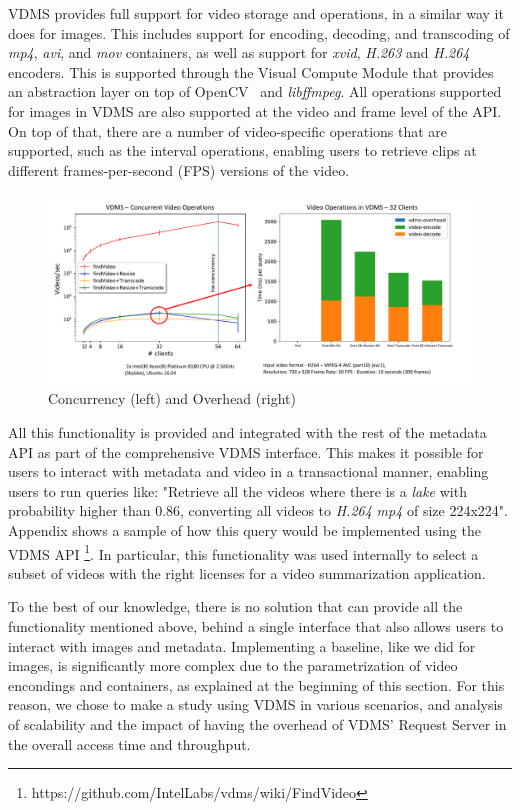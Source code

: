 VDMS provides full support for video storage and operations,
in a similar way it does for images.
This includes support for encoding, decoding, and transcoding of
\textit{mp4}, \textit{avi}, and \textit{mov} containers,
as well as support for \textit{xvid}, \textit{H.263} and \textit{H.264} encoders.
This is supported through the Visual Compute Module that provides an abstraction
layer on top of OpenCV~\cite{opencv} and \textit{libffmpeg}\cite{ffmpeg}.
All operations supported for images in VDMS are also supported at the
video and frame level of the API.
On top of that, there are a number of video-specific operations that
are supported, such as the interval operations,
enabling users to retrieve clips at different
frames-per-second (FPS) versions of the video.

\begin{figure}[ht!]
\centering
\includegraphics[width=\textwidth]{figures/video_overhead}
\caption{Concurrency (left) and Overhead (right)}
\label{fig:video}
\end{figure}

All this functionality is provided and integrated with the rest of the
metadata API as part of the comprehensive VDMS interface.
This makes it possible for users to interact with metadata and video in 
a transactional manner, enabling users to run queries like: 
"Retrieve all the videos where there is a \textit{lake} with 
probability higher than 0.86, converting all videos to \textit{H.264} 
\textit{mp4} of size 224x224".
Appendix shows a sample of how this query would be implemented using the VDMS API
\footnote{https://github.com/IntelLabs/vdms/wiki/FindVideo}.
In particular, this functionality was used internally to select a subset
of videos with the right licenses for a video summarization application.

To the best of our knowledge, there is no solution that can provide
all the functionality mentioned above, behind a single interface
that also allows users to interact with images and metadata.
Implementing a baseline, like we did for images, is significantly more complex
due to the parametrization of video encondings and containers, 
as explained at the beginning of this section.
For this reason, we chose to make a study using VDMS in various scenarios,
and analysis of scalability and the impact of having the overhead of VDMS' Request
Server in the overall access time and throughput.

